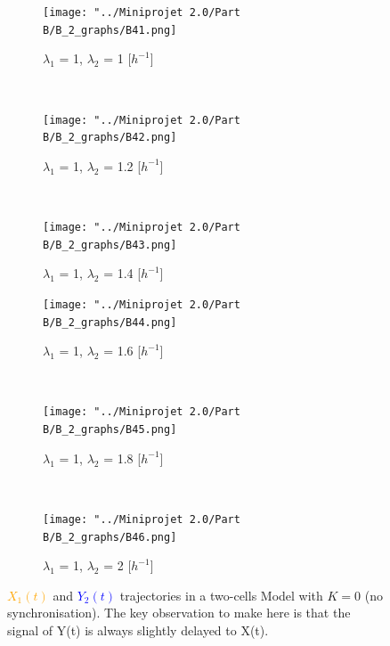 \documentclass[10pt,a4paper,oneside,twocolumn]{article}
\newcommand{\blue}[1]{\textcolor{blue}{#1}}
\newcommand{\orange}[1]{\textcolor{orange}{#1}}
\numberwithin{equation}{section} %
\begin{document}
   \begin{figure}
    \centering
	\begin{subfigure}[b]{0.32\textwidth}
	    \texttt{[image: "../Miniprojet 2.0/Part B/B\_2\_graphs/B41.png]}
	    \caption{$\lambda_1$ = 1, $\lambda_2$ = 1 [$h^{-1}$]}
	\end{subfigure}
	~ 
	\begin{subfigure}[b]{0.32\textwidth}
	    \texttt{[image: "../Miniprojet 2.0/Part B/B\_2\_graphs/B42.png]}
	    \caption{$\lambda_1$ = 1, $\lambda_2$ = 1.2 [$h^{-1}$]}
	\end{subfigure}
	~ 
	\begin{subfigure}[b]{0.32\textwidth}
	    \texttt{[image: "../Miniprojet 2.0/Part B/B\_2\_graphs/B43.png]}
	    \caption{$\lambda_1$ = 1, $\lambda_2$ = 1.4 [$h^{-1}$]}
	\end{subfigure}
	 
	\begin{subfigure}[b]{0.32\textwidth}
	    \texttt{[image: "../Miniprojet 2.0/Part B/B\_2\_graphs/B44.png]}
	    \caption{$\lambda_1$ = 1, $\lambda_2$ = 1.6 [$h^{-1}$]}
	\end{subfigure}
	~ 
	\begin{subfigure}[b]{0.32\textwidth}
	    \texttt{[image: "../Miniprojet 2.0/Part B/B\_2\_graphs/B45.png]}
	    \caption{$\lambda_1$ = 1, $\lambda_2$ = 1.8 [$h^{-1}$]}
	\end{subfigure}
	~ 
	\begin{subfigure}[b]{0.32\textwidth}
	    \texttt{[image: "../Miniprojet 2.0/Part B/B\_2\_graphs/B46.png]}
	    \caption{$\lambda_1$ = 1, $\lambda_2$ = 2 [$h^{-1}$]}
	\end{subfigure}

	\caption{\orange{$X_1(t)$} and \blue{$Y_2(t)$} trajectories in a two-cells Model with $K=0$ (no synchronisation). The key observation to make here is that the signal of Y(t) is always slightly delayed to X(t).\\
	}
    \end{figure}
\end{document}
